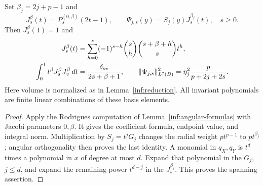 \begin{lemma}\label{inf:radial-polynomials}
Set $\beta_j=2j+p-1$ and
\begin{equation}\label{inf:radial-basis}
 J_s^\beta(t)=P_s^{(0,\beta)}(2t-1),\qquad
 \Psi_{j,s}(y)=S_j(y)J_s^{\beta_j}(t),\quad s\ge0.
\end{equation}
Then $J_s^\beta(1)=1$ and
\begin{align}
 J_s^\beta(t)&=\sum_{h=0}^s(-1)^{s-h}\binom sh
                         \binom{s+\beta+h}{s}t^h,
                         \label{inf:radial-expansion}\\
 \int_0^1t^\beta J_s^\beta J_v^\beta\,dt
 &=\frac{\delta_{sv}}{2s+\beta+1},\qquad
 \lVert \Psi_{j,s}\rVert_{L^2(B)}^2
 =\eta_j^2\frac p{p+2j+2s}.
 \label{inf:radial-norm}
\end{align}
Here volume is normalized as in Lemma~\ref{inf:reduction}. All invariant
polynomials are finite linear combinations of these basis elements.
\end{lemma}
\begin{proof}
Apply the Rodrigues computation of Lemma~\ref{inf:angular-formulas}
with Jacobi parameters $0,\beta$. It gives the coefficient formula,
endpoint value, and integral norm. Multiplication by $S_j=t^jG_j$
changes the radial weight $p t^{p-1}$ to $p t^{\beta_j}$; angular
orthogonality then proves the last identity.
A monomial in $q_X,q_Y$ is $t^d$ times a polynomial in $x$ of degree
at most $d$. Expand that polynomial in the $G_j$, $j\le d$, and expand
the remaining power $t^{d-j}$ in the $J_s^{\beta_j}$. This proves the
spanning assertion.
\end{proof}
